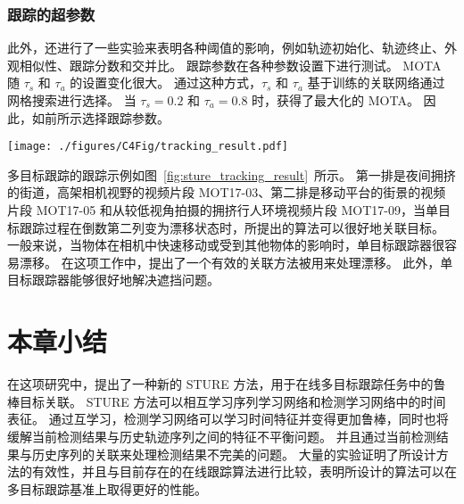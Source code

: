 \subsubsection{跟踪的超参数}
此外，还进行了一些实验来表明各种阈值的影响，例如轨迹初始化、轨迹终止、外观相似性、跟踪分数和交并比。
跟踪参数在各种参数设置下进行测试。 
MOTA 随 $\tau_s$ 和 $\tau_a$ 的设置变化很大。
通过这种方式，$ \tau _s $ 和 $ \tau _a $ 基于训练的关联网络通过网格搜索进行选择。 
当 $ \tau _s=0.2 $ 和 $ \tau _a=0.8 $ 时，获得了最大化的 MOTA。 
因此，如前所示选择跟踪参数。


\vspace{0.5em}
\begin{figure*}[ht]
	\centering
	\texttt{[image: ./figures/C4Fig/tracking\_result.pdf]}
	\vspace{0.2em}
	\caption{在基准数据集上的跟踪结果示例}
	\label{fig:sture_tracking_result}
\end{figure*}

多目标跟踪的跟踪示例如图~\ref{fig:sture_tracking_result}~所示。
第一排是夜间拥挤的街道，高架相机视野的视频片段 MOT17-03、第二排是移动平台的街景的视频片段 MOT17-05 和从较低视角拍摄的拥挤行人环境视频片段 MOT17-09，当单目标跟踪过程在倒数第二列变为漂移状态时，所提出的算法可以很好地关联目标。
一般来说，当物体在相机中快速移动或受到其他物体的影响时，单目标跟踪器很容易漂移。
在这项工作中，提出了一个有效的关联方法被用来处理漂移。
此外，单目标跟踪器能够很好地解决遮挡问题。




\section{本章小结}
在这项研究中，提出了一种新的 STURE 方法，用于在线多目标跟踪任务中的鲁棒目标关联。
STURE 方法可以相互学习序列学习网络和检测学习网络中的时间表征。
通过互学习，检测学习网络可以学习时间特征并变得更加鲁棒，同时也将缓解当前检测结果与历史轨迹序列之间的特征不平衡问题。
并且通过当前检测结果与历史序列的关联来处理检测结果不完美的问题。
大量的实验证明了所设计方法的有效性，并且与目前存在的在线跟踪算法进行比较，表明所设计的算法可以在多目标跟踪基准上取得更好的性能。
 


